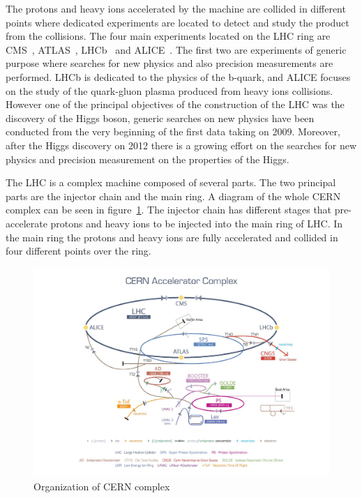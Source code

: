 The protons and heavy ions accelerated by the machine are collided in different points where dedicated experiments are located to detect and study the product from the collisions. The four main experiments located on the LHC ring are CMS~\cite{Bayatian:922757,Bayatian:942733}, ATLAS~\cite{ATLAS:1999}, LHCb~\cite{Alves:2008zz} and ALICE~\cite{Cortese:879894}. The first two are experiments of generic purpose where searches for new physics and also precision measurements are performed. LHCb is dedicated to the physics of the b-quark, and ALICE focuses on the study of the quark-gluon plasma produced from heavy ions collisions. However one of the principal objectives of the construction of the LHC was the discovery of the Higgs boson, generic searches on new physics have been conducted from the very beginning of the first data taking on 2009. Moreover, after the Higgs discovery on 2012 there is a growing effort on the searches for new physics and precision measurement on the properties of the Higgs.

The LHC is a complex machine composed of several parts. The two principal parts are the injector chain and the main ring. A diagram of the whole CERN complex can be seen in figure~\ref{fig:Complex}. The injector chain has different stages that pre-accelerate protons and heavy ions to be injected into the main ring of LHC. In the main ring the protons and heavy ions are fully accelerated and collided in four different points over the ring.

\begin{figure}[!Hhtbp]
  \begin{center}
    \includegraphics[trim=4.5cm 0cm 0cm 0cm, clip=true, width=1.15\textwidth]{figs/cern-lhc-4.jpg}
    \caption{Organization of CERN complex}
    \label{fig:Complex}
  \end{center}
\end{figure}


